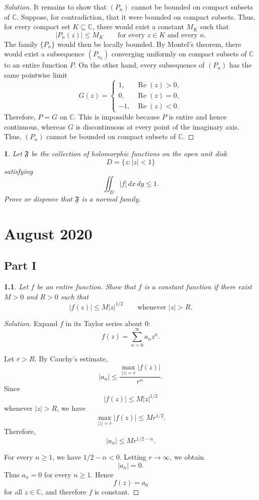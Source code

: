 \documentclass[12pt, a4paper]{report}
\theoremstyle{spaced}
\newtheorem{exercise}{}
\begin{document}
\begin{proof}[Solution]
	It remains to show that \((P_n)\) cannot be bounded on compact subsets
	of \(\mathbb{C}\). Suppose, for contradiction, that it were bounded on
	compact subsets. Thus, for every compact set \(K\subseteq\mathbb{C}\),
	there would exist a constant \(M_K\) such that
	\[
		|P_n(z)|\leq M_K
		\qquad
		\text{for every }z\in K\text{ and every }n.
	\]
	The family \(\{P_n\}\) would then be locally bounded. By Montel's
	theorem, there would exist a subsequence \((P_{n_k})\) converging
	uniformly on compact subsets of \(\mathbb{C}\) to an entire function
	\(P\).
	On the other hand, every subsequence of \((P_n)\) has the same
	pointwise limit
	\[
		G(z)
		=
		\begin{cases}
			1,  & \operatorname{Re}(z)>0, \\
			0,  & \operatorname{Re}(z)=0, \\
			-1, & \operatorname{Re}(z)<0.
		\end{cases}
	\]
	Therefore, \(P=G\) on \(\mathbb{C}\). This is impossible because \(P\)
	is entire and hence continuous, whereas \(G\) is discontinuous at every
	point of the imaginary axis.
	Thus, \((P_n)\) cannot be bounded on compact subsets of
	\(\mathbb{C}\).
\end{proof}

\begin{exercise}
	Let $\mathfrak{F}$ be the collection of holomorphic functions on the open unit
	disk
	\[
		D=\{z:|z|<1\}
	\]
	satisfying
	\[
		\iint_D |f|\,dx\,dy \leq 1.
	\]
	Prove or disprove that $\mathfrak{F}$ is a normal family.
\end{exercise}

\chapter{August 2020}

\section{Part I}
\begin{exercise}
	Let \(f\) be an entire function. Show that \(f\) is a constant function if there exist
	\(M>0\) and \(R>0\) such that
	\[
		|f(z)|\le M|z|^{1/2}
		\qquad \text{whenever } |z|>R.
	\]
\end{exercise}

\begin{proof}[Solution]
	Expand \(f\) in its Taylor series about \(0\):
	\[
		f(z)=\sum_{n=0}^{\infty} a_n z^n.
	\]

	Let \(r>R\). By Cauchy's estimate,
	\[
		|a_n|
		\leq \frac{\max_{|z|=r}|f(z)|}{r^n}.
	\]
	Since
	\[
		|f(z)|\leq M|z|^{1/2}
	\]
	whenever \(|z|>R\), we have
	\[
		\max_{|z|=r}|f(z)|\leq Mr^{1/2}.
	\]
	Therefore,
	\[
		|a_n|\leq Mr^{1/2-n}.
	\]

	For every \(n\geq 1\), we have \(1/2-n<0\). Letting \(r\to\infty\), we obtain
	\[
		|a_n|=0.
	\]
	Thus \(a_n=0\) for every \(n\geq 1\). Hence
	\[
		f(z)=a_0
	\]
	for all \(z\in\mathbb{C}\), and therefore \(f\) is constant.
\end{proof}
\end{document}
